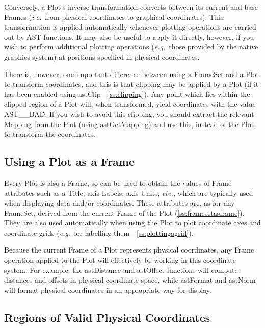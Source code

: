 \documentclass[twoside,11pt]{article}
\newcommand{\htmlref}[2]{#1}
\newcommand{\secref}[1]{\S\ref{#1}}
\renewcommand{\secref}[1]{\ref{#1}}
\begin{document}
Conversely, a Plot's inverse transformation converts between its
current and base Frames ({\em{i.e.}}\ from physical coordinates to
graphical coordinates). This transformation is applied automatically
whenever plotting operations are carried out by AST functions. It may
also be useful to apply it directly, however, if you wish to perform
additional plotting operations ({\em{e.g.}}\ those provided by the
native graphics system) at positions specified in physical
coordinates.

There is, however, one important difference between using a \htmlref{FrameSet}{FrameSet}
and a Plot to transform coordinates, and this is that clipping may be
applied by a Plot (if it has been enabled using
\htmlref{astClip}{astClip}---\secref{ss:clipping}). Any point which lies within the
clipped region of a Plot will, when transformed, yield coordinates
with the value AST\_\_BAD. If you wish to avoid this clipping, you
should extract the relevant \htmlref{Mapping}{Mapping} from the Plot (using
\htmlref{astGetMapping}{astGetMapping}) and use this, instead of the Plot, to transform the
coordinates.

\subsection{Using a Plot as a Frame}

Every \htmlref{Plot}{Plot} is also a \htmlref{Frame}{Frame}, so can be used to obtain the values of
Frame attributes such as a \htmlref{Title}{Title}, axis Labels, axis Units,
{\em{etc.,}} which are typically used when displaying data and/or
coordinates. These attributes are, as for any \htmlref{FrameSet}{FrameSet}, derived from
the current Frame of the Plot (\secref{ss:framesetasframe}). They are
also used automatically when using the Plot to plot coordinate axes
and coordinate grids ({\em{e.g.}}\ for labelling
them---\secref{ss:plottingagrid}).

Because the current Frame of a Plot represents physical coordinates,
any Frame operation applied to the Plot will effectively be working in
this coordinate system. For example, the \htmlref{astDistance}{astDistance} and \htmlref{astOffset}{astOffset}
functions will compute distances and offsets in physical coordinate
space, while \htmlref{astFormat}{astFormat} and \htmlref{astNorm}{astNorm} will format physical coordinates in
an appropriate way for display.

\subsection{\label{ss:validphysicalcoordinates}Regions of Valid Physical Coordinates}
\end{document}
